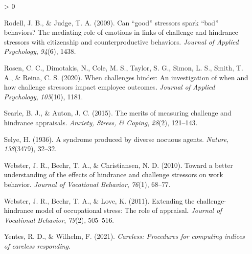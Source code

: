 \documentclass[
  english,
  man]{apa6}
\newlength{\cslhangindent}
\newenvironment{CSLReferences}[2] %
 {%
  \setlength{\parindent}{0pt}
  \ifodd #1 \everypar{\setlength{\hangindent}{\cslhangindent}}\ignorespaces\fi
  \ifnum #2 > 0
  \setlength{\parskip}{#2\baselineskip}
  \fi
 }%
 {}
\begin{document}
\begin{CSLReferences}{1}{0}
\leavevmode\hypertarget{ref-rodell2009can}{}%
Rodell, J. B., \& Judge, T. A. (2009). Can {``good''} stressors spark {``bad''} behaviors? The mediating role of emotions in links of challenge and hindrance stressors with citizenship and counterproductive behaviors. \emph{Journal of Applied Psychology}, \emph{94}(6), 1438.

\leavevmode\hypertarget{ref-rosen2020challenges}{}%
Rosen, C. C., Dimotakis, N., Cole, M. S., Taylor, S. G., Simon, L. S., Smith, T. A., \& Reina, C. S. (2020). When challenges hinder: An investigation of when and how challenge stressors impact employee outcomes. \emph{Journal of Applied Psychology}, \emph{105}(10), 1181.

\leavevmode\hypertarget{ref-searle2015merits}{}%
Searle, B. J., \& Auton, J. C. (2015). The merits of measuring challenge and hindrance appraisals. \emph{Anxiety, Stress, \& Coping}, \emph{28}(2), 121--143.

\leavevmode\hypertarget{ref-selye1936syndrome}{}%
Selye, H. (1936). A syndrome produced by diverse nocuous agents. \emph{Nature}, \emph{138}(3479), 32--32.

\leavevmode\hypertarget{ref-webster2010toward}{}%
Webster, J. R., Beehr, T. A., \& Christiansen, N. D. (2010). Toward a better understanding of the effects of hindrance and challenge stressors on work behavior. \emph{Journal of Vocational Behavior}, \emph{76}(1), 68--77.

\leavevmode\hypertarget{ref-webster2011extending}{}%
Webster, J. R., Beehr, T. A., \& Love, K. (2011). Extending the challenge-hindrance model of occupational stress: The role of appraisal. \emph{Journal of Vocational Behavior}, \emph{79}(2), 505--516.

\leavevmode\hypertarget{ref-R-careless}{}%
Yentes, R. D., \& Wilhelm, F. (2021). \emph{Careless: Procedures for computing indices of careless responding}.

\end{CSLReferences}

\endgroup
\end{document}
